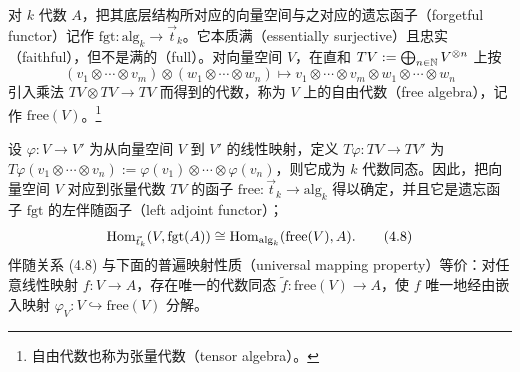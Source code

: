
对 $k$ 代数 $A$，把其底层结构所对应的向量空间与之对应的遗忘函子（forgetful functor）记作 $\mathrm{fgt}\colon\mathrm{alg}_k\to\vec{t}_k$。它本质满（essentially surjective）且忠实（faithful），但不是满的（full）。对向量空间 $V$，在直和 $TV:=\bigoplus_{n\in\mathbb{N}}V^{\otimes n}$ 上按
\begin{equation}
  (v_1\otimes\cdots\otimes v_m)\otimes(w_1\otimes\cdots\otimes w_n)
  \mapsto v_1\otimes\cdots\otimes v_m\otimes w_1\otimes\cdots\otimes w_n \tag{4.7}
\end{equation}
引入乘法 $TV\otimes TV\to TV$ 而得到的代数，称为 $V$ 上的自由代数（free algebra），记作 $\mathrm{free}(V)$。\footnote{自由代数也称为张量代数（tensor algebra）。}

设 $\varphi\colon V\to V'$ 为从向量空间 $V$ 到 $V'$ 的线性映射，定义 $T\varphi\colon TV\to TV'$ 为 $T\varphi(v_1\otimes\cdots\otimes v_n):=\varphi(v_1)\otimes\cdots\otimes\varphi(v_n)$，则它成为 $k$ 代数同态。因此，把向量空间 $V$ 对应到张量代数 $TV$ 的函子 $\mathrm{free}\colon\vec{t}_k\to\mathrm{alg}_k$ 得以确定，并且它是遗忘函子 $\mathrm{fgt}$ 的左伴随函子（left adjoint functor）；
\begin{equation}
  \operatorname{Hom}_{\vec{t}_k}(V,\mathrm{fgt}(A)) \cong \operatorname{Hom}_{\mathrm{alg}_k}(\mathrm{free}(V),A). \tag{4.8}
\end{equation}
伴随关系 (4.8) 与下面的普遍映射性质（universal mapping property）等价：对任意线性映射 $f\colon V\to A$，存在唯一的代数同态 $\tilde f\colon\mathrm{free}(V)\to A$，使 $f$ 唯一地经由嵌入映射 $\varphi_V\colon V\hookrightarrow\mathrm{free}(V)$ 分解。

